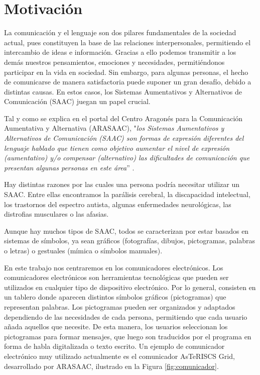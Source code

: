 \documentclass[11pt,spanish,listoffigures,listoftables]{tfgetsinf}
\begin{document}
\section{Motivación}

La comunicación y el lenguaje son dos pilares fundamentales de la sociedad actual, pues constituyen la base de las relaciones interpersonales, permitiendo el intercambio de ideas e información. Gracias a ello podemos transmitir a los demás nuestros pensamientos, emociones y necesidades, permitiéndonos participar en la vida en sociedad. Sin embargo, para algunas personas, el hecho de comunicarse de manera satisfactoria puede suponer un gran desafío, debido a distintas causas. En estos casos, los Sistemas Aumentativos y Alternativos de Comunicación (SAAC) juegan un papel crucial.

Tal y como se explica en el portal del Centro Aragonés para la Comunicación Aumentativa y Alternativa (ARASAAC), "\textit{los Sistemas Aumentativos y Alternativos de Comunicación (SAAC) son formas de expresión diferentes del lenguaje hablado que tienen como objetivo aumentar el nivel de expresión (aumentativo) y/o compensar (alternativo) las dificultades de comunicación que presentan algunas personas en este área}” \cite{arasaac}.

Hay distintas razones por las cuales una persona podría necesitar utilizar un SAAC. Entre ellas encontramos la parálisis cerebral, la discapacidad intelectual, los trastornos del espectro autista, algunas enfermedades neurológicas, las distrofias musculares o las afasias.

Aunque hay muchos tipos de SAAC, todos se caracterizan por estar basados en sistemas de símbolos, ya sean gráficos (fotografías, dibujos, pictogramas, palabras o letras) o gestuales (mímica o símbolos manuales).

En este trabajo nos centraremos en los comunicadores electrónicos. Los comunicadores electrónicos son herramientas tecnológicas que pueden ser utilizados en cualquier tipo de dispositivo electrónico. Por lo general, consisten en un tablero donde aparecen distintos símbolos gráficos (pictogramas) que representan palabras. Los pictogramas pueden ser organizados y adaptados dependiendo de las necesidades de cada persona, permitiendo que cada usuario añada aquellos que necesite. De esta manera, los usuarios seleccionan los pictogramas para formar mensajes, que luego son traducidos por el programa en forma de habla digitalizada o texto escrito. Un ejemplo de comunicador electrónico muy utilizado actualmente es el comunicador AsTeRISCS Grid, desarrollado por ARASAAC, ilustrado en la Figura \ref{fig:comunicador}.
\end{document}
